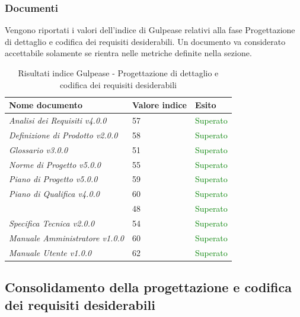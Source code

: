 	 	\subsubsection{Documenti}	 	
	 	Vengono riportati i valori dell'indice di Gulpease relativi alla fase Progettazione di dettaglio e codifica dei requisiti desiderabili. Un documento va considerato accettabile solamente se rientra nelle metriche definite nella sezione.
		\begin{table}[!ht]
			\begin{center}
				\begin{tabularx}{0.9\textwidth}{|l|l|X|}
					\hline
					\textbf{Nome documento} & \textbf{Valore indice} & \textbf{Esito}\\
					\hline						
					\emph{Analisi dei Requisiti v4.0.0} & 57 & \textcolor{green}{Superato}\\
					\hline
					\emph{Definizione di Prodotto v2.0.0} & 58 & \textcolor{green}{Superato}\\
					\hline
					\emph{Glossario v3.0.0} & 51 & \textcolor{green}{Superato}\\
					\hline					
					\emph{Norme di Progetto v5.0.0} & 55 & \textcolor{green}{Superato}\\
					\hline					
					\emph{Piano di Progetto v5.0.0} & 59 & \textcolor{green}{Superato}\\
					\hline					
					\emph{Piano di Qualifica v4.0.0} & 60 & \textcolor{green}{Superato}\\
					\hline					
					\docNameVersionSdF & 48 & \textcolor{green}{Superato}\\
					\hline	
					\emph{Specifica Tecnica v2.0.0} & 54 & \textcolor{green}{Superato}\\
					\hline
					\emph{Manuale Amministratore v1.0.0} & 60 & \textcolor{green}{Superato}\\
					\hline
					\emph{Manuale Utente v1.0.0} & 62 & \textcolor{green}{Superato}\\			
					\hline
				\end{tabularx}
			\end{center}
			\caption{Risultati indice Gulpease - Progettazione di dettaglio e codifica dei requisiti desiderabili}
		\end{table}

	\subsection{Consolidamento della progettazione e codifica dei requisiti desiderabili}
